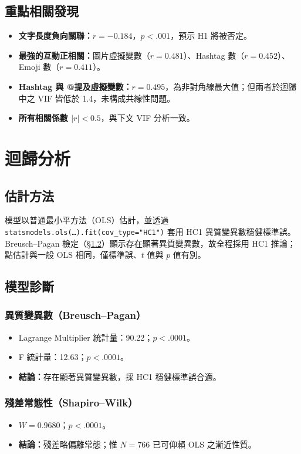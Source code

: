 \documentclass[12pt,a4paper]{ctexart}
\begin{document}
\subsection{重點相關發現}

\begin{itemize}
    \item \textbf{文字長度負向關聯：}$r=-0.184$，$p<.001$，預示 H1 將被否定。
    \item \textbf{最強的互動正相關：}圖片虛擬變數（$r=0.481$）、Hashtag 數（$r=0.452$）、Emoji 數（$r=0.411$）。
    \item \textbf{Hashtag 與 @提及虛擬變數：}$r=0.495$，為非對角線最大值；但兩者於迴歸中之 VIF 皆低於 1.4，未構成共線性問題。
    \item \textbf{所有相關係數 $|r|<0.5$}，與下文 VIF 分析一致。
\end{itemize}

\newpage

\section{迴歸分析}

\subsection{估計方法}

模型以普通最小平方法（OLS）估計，並透過 \texttt{statsmodels.ols(\ldots).fit(cov\_type="HC1")} 套用 HC1 異質變異數穩健標準誤。Breusch--Pagan 檢定（§\ref{sec:diag}）顯示存在顯著異質變異數，故全程採用 HC1 推論；點估計與一般 OLS 相同，僅標準誤、$t$ 值與 $p$ 值有別。

\subsection{模型診斷}
\label{sec:diag}

\subsubsection{異質變異數（Breusch--Pagan）}
\begin{itemize}
    \item Lagrange Multiplier 統計量：90.22；$p<.0001$。
    \item F 統計量：12.63；$p<.0001$。
    \item \textbf{結論：}存在顯著異質變異數，採 HC1 穩健標準誤合適。
\end{itemize}

\subsubsection{殘差常態性（Shapiro--Wilk）}
\begin{itemize}
    \item $W = 0.9680$；$p<.0001$。
    \item \textbf{結論：}殘差略偏離常態；惟 $N=766$ 已可仰賴 OLS 之漸近性質。
\end{itemize}
\end{document}
